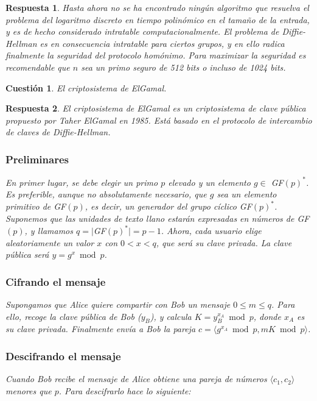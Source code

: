 \documentclass[
  a4paper,
  spanish,
  12pt,
]{scrartcl}
\theoremstyle{ejercicio-style}
\newtheorem{ejer}{Cuestión}
\theoremstyle{remark-style}
\newtheorem*{sol}{Respuesta}
\theoremstyle{teorema-style}
\begin{document}
\begin{sol}
  Hasta ahora no se ha encontrado ningún algoritmo que resuelva el problema del logaritmo discreto en tiempo polinómico en el tamaño de la entrada, y es de hecho considerado intratable computacionalmente.
  El problema de Diffie-Hellman es en consecuencia intratable para ciertos grupos, y en ello radica finalmente la seguridad del protocolo homónimo. Para maximizar la seguridad es recomendable que $n$ sea un \textit{primo seguro} de 512 bits o incluso de 1024 bits.
\end{sol}

\begin{ejer}
  El criptosistema de ElGamal.
\end{ejer}

\begin{sol}
El criptosistema de ElGamal es un criptosistema de clave pública propuesto por Taher ElGamal en 1985. Está basado en el protocolo de intercambio de claves de Diffie-Hellman.

\subsubsection*{Preliminares}

En primer lugar, se debe elegir un primo $p$ elevado y un elemento  $g \in$ GF$(p)^\ast$. Es preferible, aunque no absolutamente necesario, que $g$ sea un elemento primitivo de GF$(p)$, es decir, un generador del grupo cíclico GF$(p)^\ast$. Suponemos que las unidades de texto llano estarán expresadas en números de GF$(p)$, y llamamos $q = |$GF$(p)^\ast| = p -1$. Ahora, cada usuario elige aleatoriamente un valor $x$ con $0 < x < q$, que será su clave privada. La clave pública será $y = g^x \bmod p$.

\subsubsection*{Cifrando el mensaje}

Supongamos que Alice quiere compartir con Bob un mensaje \(0\leq m \leq q\). Para ello, recoge la clave pública de Bob ($y_B$), y calcula $K = y_B ^{x_A} \bmod p$, donde $x_A$ es su clave privada. Finalmente envía a Bob la pareja \(c = \langle g^{x_{A}} \bmod{p}, mK \bmod p\rangle\).

\subsubsection*{Descifrando el mensaje}

Cuando Bob recibe el mensaje de Alice obtiene una pareja de números $\langle c_1, c_2 \rangle$ menores que $p$. Para descifrarlo hace lo siguiente:


\end{sol}
\end{document}
